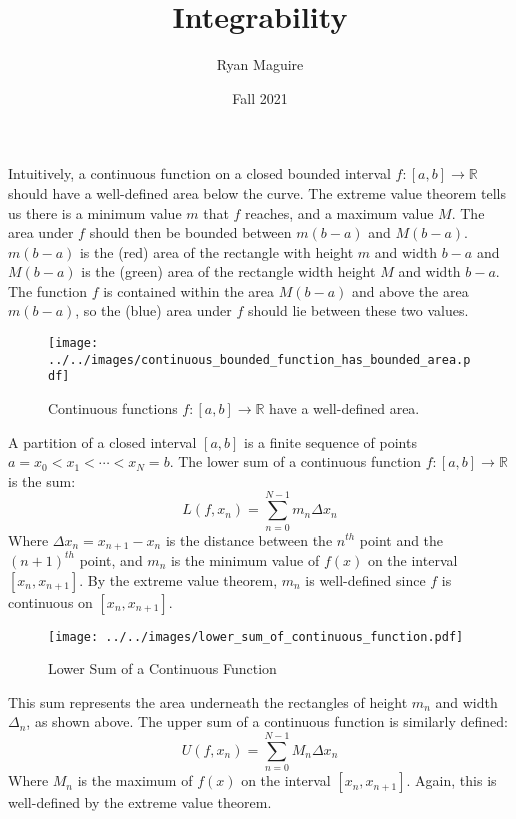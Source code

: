 \documentclass{article}
\title{Integrability}
\author{Ryan Maguire}
\date{Fall 2021}
\theoremstyle{normal}
\theoremstyle{plain}
\begin{document}
    \maketitle
    Intuitively, a continuous function on a closed bounded interval
    $f:[a,b]\rightarrow\mathbb{R}$ should have a well-defined area below
    the curve. The extreme value theorem tells us there is a minimum value
    $m$ that $f$ reaches, and a maximum value $M$. The area under $f$ should
    then be bounded between $m(b-a)$ and $M(b-a)$. $m(b-a)$ is the (red) area
    of the rectangle with height $m$ and width $b-a$ and $M(b-a)$ is the
    (green) area of the rectangle width height $M$ and width $b-a$. The
    function $f$ is contained within the area $M(b-a)$ and above the area
    $m(b-a)$, so the (blue) area under $f$ should lie between these two values.
    \begin{figure}[H]
        \centering
        \texttt{[image: ../../images/continuous\_bounded\_function\_has\_bounded\_area.pdf]}
        \caption{Continuous functions $f:[a,b]\rightarrow\mathbb{R}$ have a
                 well-defined area.}
    \end{figure}
    A partition of a closed interval $[a,b]$ is a finite sequence of points
    $a=x_{0}<x_{1}<\cdots<x_{N}=b$. The lower sum of a continuous function
    $f:[a,b]\rightarrow\mathbb{R}$ is the sum:
    \begin{equation}
        L(f,x_{n})=\sum_{n=0}^{N-1}m_{n}\Delta{x}_{n}
    \end{equation}
    Where $\Delta{x}_{n}=x_{n+1}-x_{n}$ is the distance between the
    $n^{th}$ point and the $(n+1)^{th}$ point, and
    $m_{n}$ is the minimum value of $f(x)$ on the interval $[x_{n},x_{n+1}]$.
    By the extreme value theorem, $m_{n}$ is well-defined since $f$ is
    continuous on $[x_{n},x_{n+1}]$.
    \begin{figure}[H]
        \centering
        \texttt{[image: ../../images/lower\_sum\_of\_continuous\_function.pdf]}
        \caption{Lower Sum of a Continuous Function}
    \end{figure}
    This sum represents the area underneath the rectangles of height $m_{n}$
    and width $\Delta_{n}$, as shown above. The upper sum of a continuous
    function is similarly defined:
    \begin{equation}
        U(f,x_{n})=\sum_{n=0}^{N-1}M_{n}\Delta{x}_{n}
    \end{equation}
    Where $M_{n}$ is the maximum of $f(x)$ on the interval $[x_{n},x_{n+1}]$.
    Again, this is well-defined by the extreme value theorem.
\end{document}
